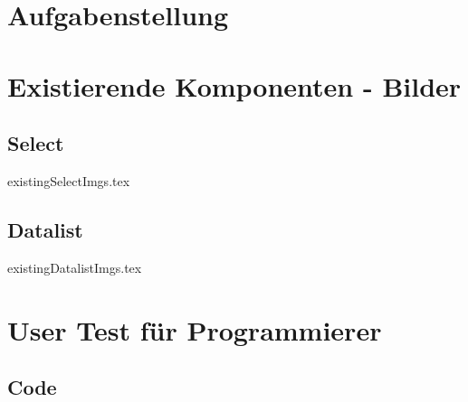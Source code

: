\chapter{Aufgabenstellung}




\chapter{Existierende Komponenten - Bilder}

\section*{Select}
\graphicspath{ {./img/select/} }
{existingSelectImgs.tex}
\graphicspath{ {./img/} }

\clearpage
\section*{Datalist}
\graphicspath{ {./img/datalist/} }
{existingDatalistImgs.tex}
\graphicspath{ {./img/} }


\chapter{User Test für Programmierer}

\section*{Code}

